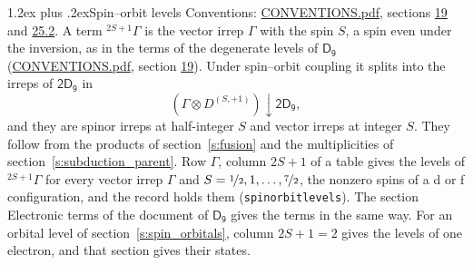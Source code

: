 \documentclass[10pt,a4paper]{article}
\makeatletter
\renewcommand\section{\@startsection{section}{1}{\z@}{-3ex plus -1ex minus -.2ex}%
  {1.2ex plus .2ex}{\normalfont\large\sffamily\bfseries\color{parttitle}}}
\numberwithin{equation}{section}
\newcommand{\grp}[1]{\mathsf{#1}}
\newcommand{\restr}[2]{#1\!\downarrow#2}
\newcommand{\irrJp}[2]{D^{(#1,#2)}}
\newcommand{\irrprod}{\otimes}
\newcommand{\term}[2]{{}^{#1}#2}
\makeatother
\begin{document}
\section{Spin--orbit levels}\label{s:spin_orbit}
Conventions: \href{../../CONVENTIONS.pdf}{CONVENTIONS.pdf}, sections \href{../../../rotation/CONVENTIONS.pdf\#conv.19}{19} and \href{../../CONVENTIONS.pdf\#conv.25.2}{25.2}.
\leavevmode\label{n:local.spin}\label{n:symbol.term}A term $\term{2S+1}{\Gamma}$ is the vector irrep $\Gamma$ with the spin $S$, a spin even under the inversion, as in the terms of the degenerate levels of \href{../../../rotation/data/pdf/D9.pdf}{$\grp{D_{9}}$} (\href{../../CONVENTIONS.pdf}{CONVENTIONS.pdf}, section \href{../../../rotation/CONVENTIONS.pdf\#conv.19}{19}). Under spin--orbit coupling it splits into the irreps of $\grp{2D_{9}}$ in
\begin{equation}\label{e:spinorbit}\restr{(\Gamma \irrprod \irrJp{S}{+1})}{\grp{2D_{9}}},\end{equation}
and they are spinor irreps at half-integer $S$ and vector irreps at integer $S$. They follow from the products of section~\ref{s:fusion} and the multiplicities of section~\ref{s:subduction_parent}. Row $\Gamma$, column $2S + 1$ of a table gives the levels of $\term{2S+1}{\Gamma}$ for every vector irrep $\Gamma$ and $S = \nicefrac{1}{2}, 1, \dots, \nicefrac{7}{2}$, the nonzero spins of a d or f configuration, and the record holds them (\texttt{spinorbitlevels}). The section Electronic terms of the document of \href{../../../rotation/data/pdf/D9.pdf}{$\grp{D_{9}}$} gives the terms in the same way. For an orbital level of section~\ref{s:spin_orbitals}, column $2S + 1 = 2$ gives the levels of one electron, and that section gives their states.
\end{document}
